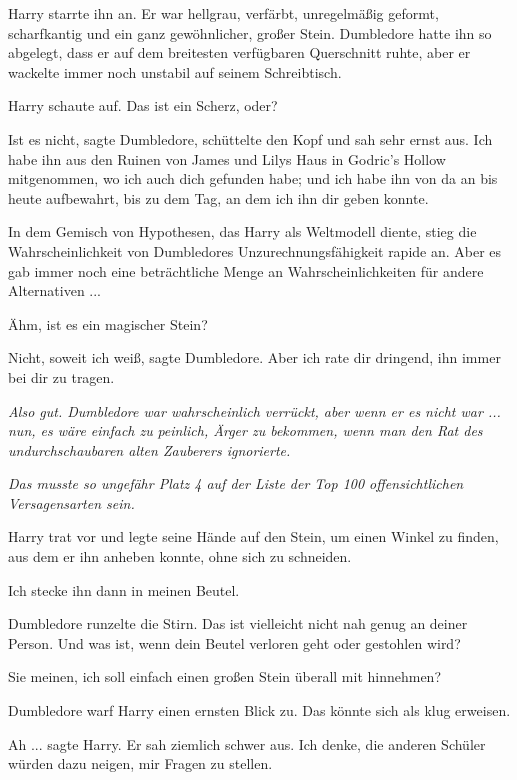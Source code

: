 Harry starrte ihn an. Er war hellgrau, verfärbt, unregelmäßig geformt,
scharfkantig und ein ganz gewöhnlicher, großer Stein. Dumbledore hatte ihn so
abgelegt, dass er auf dem breitesten verfügbaren Querschnitt ruhte, aber er
wackelte immer noch unstabil auf seinem Schreibtisch.

Harry schaute auf. \glqq{}Das ist ein Scherz, oder?\grqq{}

\glqq{}Ist es nicht\grqq{}, sagte Dumbledore, schüttelte den Kopf und sah sehr
ernst aus. \glqq{}Ich habe ihn aus den Ruinen von James und Lilys Haus in
Godric's Hollow mitgenommen, wo ich auch dich gefunden habe; und ich habe ihn
von da an bis heute aufbewahrt, bis zu dem Tag, an dem ich ihn dir geben
konnte.\grqq{}

In dem Gemisch von Hypothesen, das Harry als Weltmodell diente, stieg die
Wahrscheinlichkeit von Dumbledores Unzurechnungsfähigkeit rapide an. Aber es gab
immer noch eine beträchtliche Menge an Wahrscheinlichkeiten für andere
Alternativen ...

\glqq{}Ähm, ist es ein magischer Stein?\grqq{}

\glqq{}Nicht, soweit ich weiß\grqq{}, sagte Dumbledore. \glqq{}Aber ich rate dir
dringend, ihn immer bei dir zu tragen.\grqq{}

\emph{Also gut. Dumbledore war wahrscheinlich verrückt, aber wenn er es nicht
war ... nun, es wäre einfach zu} \emph{peinlich, Ärger zu bekommen, wenn man den
Rat des undurchschaubaren alten Zauberers ignorierte.}

\emph{Das musste so ungefähr Platz 4 auf der Liste der Top 100 offensichtlichen
Versagensarten sein.}

Harry trat vor und legte seine Hände auf den Stein, um einen Winkel zu finden,
aus dem er ihn anheben konnte, ohne sich zu schneiden.

\glqq{}Ich stecke ihn dann in meinen Beutel.\grqq{}

Dumbledore runzelte die Stirn. \glqq{}Das ist vielleicht nicht nah genug an
deiner Person. Und was ist, wenn dein Beutel verloren geht oder gestohlen
wird?\grqq{}

\glqq{}Sie meinen, ich soll einfach einen großen Stein überall mit
hinnehmen?\grqq{}

Dumbledore warf Harry einen ernsten Blick zu. \glqq{}Das könnte sich als klug
erweisen.\grqq{}

\glqq{}Ah ...\grqq{} sagte Harry. Er sah ziemlich schwer aus. \glqq{}Ich denke,
die anderen Schüler würden dazu neigen, mir Fragen zu stellen.\grqq{}

